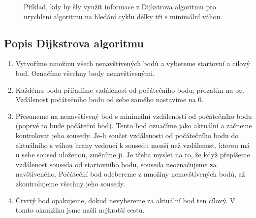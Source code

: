 \begin{figure}[H]
  \centering
  \caption{Příklad, kdy by šly využít informace z Dijkstrova algoritmu pro urychlení algoritmu na hledání cyklu délky tři s minimální váhou.}
\end{figure}




\subsection{Popis Dijkstrova algoritmu}
\label{subsec:popis-algoritmu}
\begin{enumerate}
  \item Vytvoříme množinu všech nenavštívených bodů a vybereme startovní a cílový bod. Označíme všechny body nenavštívenými.
  \item Každému bodu přiřadíme vzdálenost od počátečního bodu; prozatím na $\infty$. Vzdálenost počátečního bodu od sebe samého nastavíme na $0$.
  \item Přesuneme na nenavštívený bod s minimální vzdáleností od počátečního bodu (poprvé to bude počáteční bod).
        Tento bod označíme jako aktuální a začneme kontrolovat jeho sousedy.
        Je-li součet vzdálenosti od počátečního bodu do aktuálního s váhou hrany vedoucí k sousedu menší než vzdálenost, kterou má u sebe soused uloženou, změníme ji.
        Je třeba myslet na to, že když přepíšeme vzdálenost souseda od startovního bodu, souseda neoznačujeme za navštíveného. Počáteční bod odebereme z množiny nenavštívených bodů, až zkontrolujeme všechny jeho sousedy.
  \item Čtvrtý bod opakujeme, dokud nevybereme za aktuální bod ten cílový. V tomto okamžiku jsme našli nejkratší cestu.
\end{enumerate}